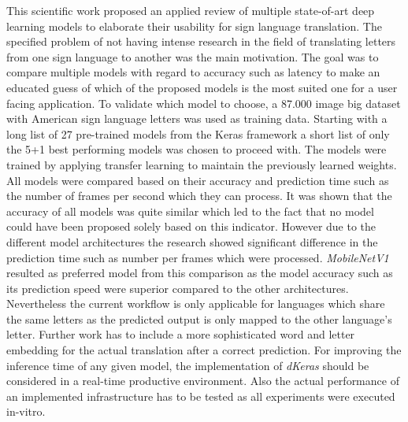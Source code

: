 This scientific work proposed an applied review of multiple state-of-art deep learning models to elaborate their usability for sign language translation. The specified problem of not having intense research in the field of translating letters from one sign language to another was the main motivation. The goal was to compare multiple models with regard to accuracy such as latency to make an educated guess of which of the proposed models is the most suited one for a user facing application. To validate which model to choose, a 87.000 image big dataset with American sign language letters was used as training data. Starting with a long list of 27 pre-trained models from the Keras framework a short list of only the 5+1 best performing models was chosen to proceed with. The models were trained by applying transfer learning to maintain the previously learned weights. All models were compared based on their accuracy and prediction time such as the number of frames per second which they can process. It was shown that the accuracy of all models was quite similar which led to the fact that no model could have been proposed solely based on this indicator. However due to the different model architectures the research showed significant difference in the prediction time such as number per frames which were processed. \textit{MobileNetV1} resulted as preferred model from this comparison as the model accuracy such as its prediction speed were superior compared to the other architectures.
Nevertheless the current workflow is only applicable for languages which share the same letters as the predicted output is only mapped to the other language's letter. Further work has to include a more sophisticated word and letter embedding for the actual translation after a correct prediction. For improving the inference time of any given model, the implementation of \textit{dKeras} should be considered in a real-time productive environment.
Also the actual performance of an implemented infrastructure has to be tested as all experiments were executed in-vitro.